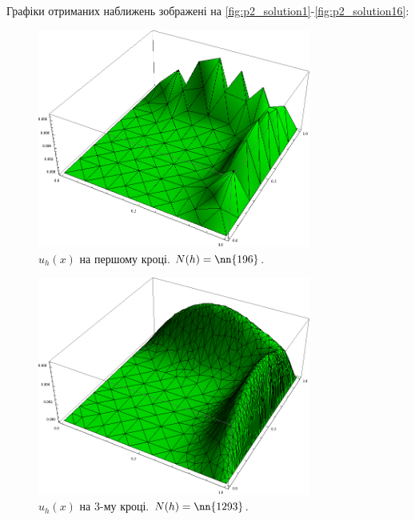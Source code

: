 Графіки отриманих наближень зображені на \autoref{fig:p2_solution1}-\ref{fig:p2_solution16}:
%
\begin{figure}[H]
	\centering
    \includegraphics[width=0.8\textwidth]{problem2/my/solutions/solution1}
    \caption{$u_h(x)$ на першому кроці. $N(h) = \nn{196}$.}
    \label{fig:p2_solution1}
\end{figure}
%
\begin{figure}[H]
	\centering
    \includegraphics[width=0.8\textwidth]{problem2/my/solutions/solution3}
    \caption{$u_h(x)$ на 3-му кроці. $N(h) = \nn{1293}$.}
    \label{fig:p2_solution3}
\end{figure}
%

